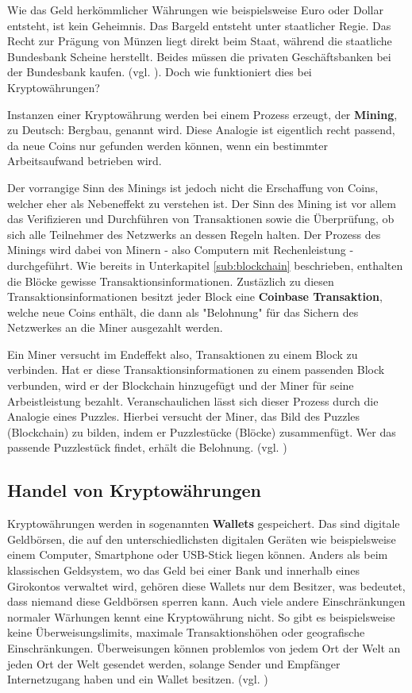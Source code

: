 \documentclass[oneside]{ausarbeitung}
\begin{document}
Wie das Geld herkömmlicher Währungen wie beispielsweise Euro oder
Dollar entsteht, ist kein Geheimnis. Das Bargeld entsteht unter
staatlicher Regie. Das Recht zur Prägung von Münzen liegt direkt
beim Staat, während die staatliche Bundesbank Scheine herstellt.
Beides müssen die privaten Geschäftsbanken bei der Bundesbank
kaufen. (vgl. \cite{herstellung_fiat_waehrung}). Doch wie funktioniert
dies bei Kryptowährungen?  

Instanzen einer Kryptowährung werden bei einem Prozess erzeugt, der
\textbf{Mining}, zu Deutsch: Bergbau, genannt wird. Diese Analogie ist
eigentlich recht passend, da neue Coins nur gefunden werden können,
wenn ein bestimmter Arbeitsaufwand betrieben wird.

Der vorrangige Sinn des Minings ist jedoch nicht die Erschaffung von
Coins, welcher eher als Nebeneffekt zu verstehen ist. Der Sinn des
Mining ist vor allem das Verifizieren und Durchführen von
Transaktionen sowie die Überprüfung, ob sich alle Teilnehmer des
Netzwerks an dessen Regeln halten. Der Prozess des Minings wird dabei
von Minern - also Computern mit Rechenleistung - durchgeführt. Wie
bereits in Unterkapitel \ref{sub:blockchain} beschrieben, enthalten
die Blöcke gewisse Transaktionsinformationen. Zustäzlich zu diesen
Transaktionsinformationen besitzt jeder Block eine \textbf{Coinbase
Transaktion}, welche neue Coins enthält, die dann als "Belohnung"
für das Sichern des Netzwerkes an die Miner ausgezahlt werden.  

Ein Miner versucht im Endeffekt also, Transaktionen zu einem Block zu
verbinden. Hat er diese Transaktionsinformationen zu einem passenden
Block verbunden, wird er der Blockchain hinzugefügt und der Miner
für seine Arbeistleistung bezahlt. Veranschaulichen lässt sich
dieser Prozess durch die Analogie eines Puzzles.  Hierbei versucht der
Miner, das Bild des Puzzles (Blockchain) zu bilden, indem er
Puzzlestücke (Blöcke) zusammenfügt. Wer das passende Puzzlestück
findet, erhält die Belohnung. (vgl. \cite{mining})


\subsection{Handel von Kryptowährungen}
\label{sub:handel_von_kryptowährungen}

Kryptowährungen werden in sogenannten \textbf{Wallets} gespeichert.
Das sind digitale Geldbörsen, die auf den unterschiedlichsten
digitalen Geräten wie beispielsweise einem Computer, Smartphone oder
USB-Stick liegen können. Anders als beim klassischen Geldsystem, wo
das Geld bei einer Bank und innerhalb eines Girokontos verwaltet wird,
gehören diese Wallets nur dem Besitzer, was bedeutet, dass niemand
diese Geldbörsen sperren kann. Auch viele andere Einschränkungen
normaler Wärhungen kennt eine Kryptowährung nicht. So gibt es
beispielsweise keine Überweisungslimits, maximale Transaktionshöhen
oder geografische Einschränkungen. Überweisungen können problemlos
von jedem Ort der Welt an jeden Ort der Welt gesendet werden, solange
Sender und Empfänger Internetzugang haben und ein Wallet besitzen.
(vgl. \cite{bitcoins_erklärung})
\end{document}
